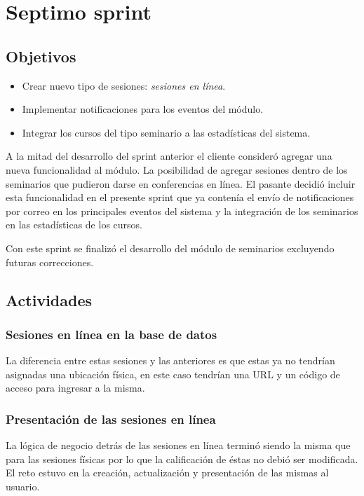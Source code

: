 ﻿\section{Septimo sprint} %
\label{sec:septimo_sprint}

\subsection{Objetivos}

\begin{itemize}
	\item Crear nuevo tipo de sesiones: \emph{sesiones en línea}.
	\item Implementar notificaciones para los eventos del módulo.
	\item Integrar los cursos del tipo seminario a las estadísticas del sistema.
\end{itemize}

A la mitad del desarrollo del sprint anterior el cliente consideró agregar una nueva funcionalidad al módulo. La posibilidad de agregar sesiones dentro de los seminarios que pudieron darse en conferencias en línea. El pasante decidió incluir esta funcionalidad en el presente sprint que ya contenía el envío de notificaciones por correo en los principales eventos del sistema y la integración de los seminarios en las estadísticas de los cursos.

Con este sprint se finalizó el desarrollo del módulo de seminarios excluyendo futuras correcciones.

\subsection{Actividades} %
\label{sub:actividades7}

\subsubsection{Sesiones en línea en la base de datos}

La diferencia entre estas sesiones y las anteriores es que estas ya no tendrían asignadas una ubicación física, en este caso tendrían una URL y un código de acceso para ingresar a la misma. 

\subsubsection{Presentación de las sesiones en línea}

La lógica de negocio detrás de las sesiones en línea terminó siendo la misma que para las sesiones físicas por lo que la calificación de éstas no debió ser modificada. El reto estuvo en la creación, actualización y presentación de las mismas al usuario.

